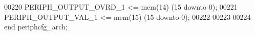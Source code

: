 \begin{DoxyCode}
00220       \textcolor{vhdlchar}{PERIPH_OUTPUT_OVRD_1} \textcolor{vhdlchar}{<=} \textcolor{vhdlchar}{mem}\textcolor{vhdlchar}{(}\textcolor{vhdllogic}{}\textcolor{vhdllogic}{14}\textcolor{vhdlchar}{)} \textcolor{vhdlchar}{(}\textcolor{vhdllogic}{}\textcolor{vhdllogic}{15} \textcolor{keywordflow}{downto} \textcolor{vhdllogic}{}\textcolor{vhdllogic}{0}\textcolor{vhdlchar}{)};
00221       \textcolor{vhdlchar}{PERIPH_OUTPUT_VAL_1}   \textcolor{vhdlchar}{<=} \textcolor{vhdlchar}{mem}\textcolor{vhdlchar}{(}\textcolor{vhdllogic}{}\textcolor{vhdllogic}{15}\textcolor{vhdlchar}{)} \textcolor{vhdlchar}{(}\textcolor{vhdllogic}{}\textcolor{vhdllogic}{15} \textcolor{keywordflow}{downto} \textcolor{vhdllogic}{}\textcolor{vhdllogic}{0}\textcolor{vhdlchar}{)};
00222         
00223         
00224 \textcolor{keywordflow}{end} \textcolor{vhdlchar}{periphcfg\_arch};
\end{DoxyCode}

